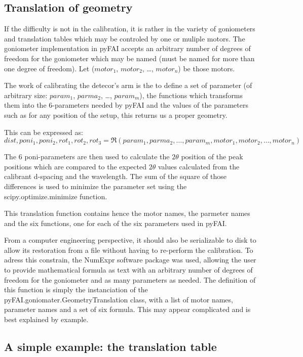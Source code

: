 \documentclass{iucr}              %
\begin{document}
\subsection{Translation of geometry}

If the difficulty is not in the calibration, it is  rather in the variety of
goniometers and translation tables which may be controled by one or muliple
motors.
The goniometer implementation in pyFAI accepts an arbitrary number of degrees of
freedom for the goniometer which may be named (must be named for more than one
degree of freedom). 
Let ($motor_1$, $motor_2$, \ldots, $motor_n$) be those motors. 

The work of calibrating the detecor's arm is the to define a set of parameter
(of arbitrary size: $param_1$, $parma_2$, \ldots, $param_m$), the functions
which transforms them into the 6-parameters needed by pyFAI and the values
of the parameters such as for any position of the setup, this returns us a
proper geometry.

This can be expressed as:
$$
dist, poni_1, poni_2, rot_1, rot_2, rot_3 = \Re(param_1, parma_2, \ldots,
param_m, motor_1, motor_2, \ldots, motor_n) 
$$

The 6 poni-parameters are then used to calculate the $2\theta$
position of the peak positions which are compared to the expected $2\theta$
values calculated from the calibrant d-spacing and the wavelength. 
The sum of the square of those differences is used to minimize the parameter set
using the scipy.optimize.minimize function\cite{scipy}.

This translation function contains hence the motor names, the parmeter names and
the six functions, one for each of the six parameters used in pyFAI. 

From a computer engineering perspective, it should also be serializable to 
disk to allow its restoration from a file without having to re-perform
the calibration. 
To adress this constrain, the NumExpr software package \cite{numexpr} was
used, allowing the user to provide mathematical formula as text with an
arbitrary number of degrees of freedom for the goniometer and as many parameters
as needed.
The definition of this function is simply the instanciation of the
pyFAI.goniomater.GeometryTranslation class, with a list of motor names,
parameter names and a set of six formula. 
This may appear complicated and is best explained by example.

\subsection{A simple example: the translation table}
\end{document}
